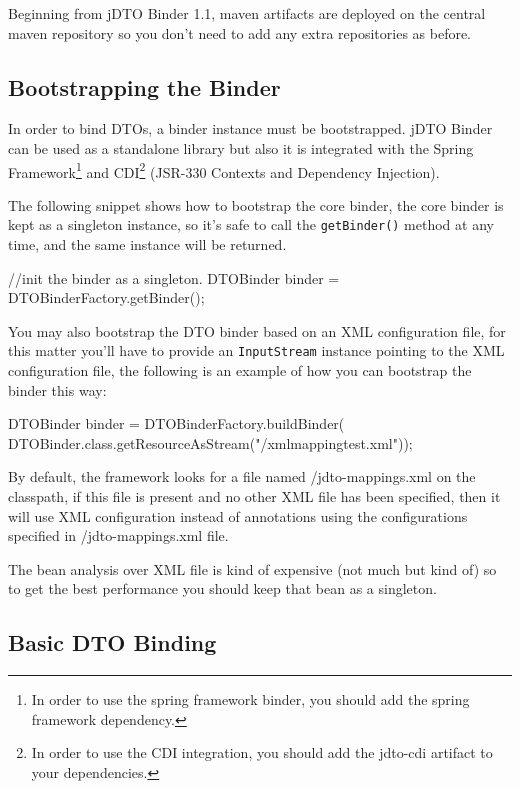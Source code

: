 \documentclass[11pt]{article}
\newcommand{\JDTO}{jDTO Binder\xspace}
\newcommand{\DEFAULTCONFIG}{/jdto-mappings.xml\xspace}
\begin{document}
Beginning from \JDTO 1.1, maven artifacts are deployed on the central maven repository so you don't need to add any extra repositories as before.

\subsection{Bootstrapping the Binder}


In order to bind DTOs, a binder instance must be bootstrapped. \JDTO can be used as a standalone library but also it is integrated with the Spring Framework\footnote{In order to use the spring framework binder, you should add the spring framework dependency.} and CDI\footnote{In order to use the CDI integration, you should add the jdto-cdi artifact to your dependencies.} (JSR-330 Contexts and Dependency Injection).


The following snippet shows how to bootstrap the core binder, the core binder is kept as a singleton instance, so it's safe to call the \texttt{getBinder()} method at any time, and the same instance will be returned.


\begin{java}
//init the binder as a singleton.
DTOBinder binder = DTOBinderFactory.getBinder();
\end{java}

You may also bootstrap the DTO binder based on an XML configuration file, for this matter you'll have to provide an \texttt{InputStream} instance pointing to the XML configuration file, the following is an example of how you can bootstrap the binder this way:


\begin{java}
DTOBinder binder = DTOBinderFactory.buildBinder(
    DTOBinder.class.getResourceAsStream("/xmlmappingtest.xml"));
\end{java}

By default, the framework looks for a file named \DEFAULTCONFIG on the classpath, if this file is present and no other XML file has been specified, then it will use XML configuration instead of annotations using the configurations specified in \DEFAULTCONFIG file.

The bean analysis over XML file is kind of expensive (not much but kind of) so to get the best performance you should keep that bean as a singleton.

\subsection{Basic DTO Binding}
\end{document}

